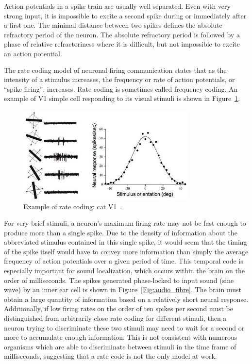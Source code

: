 Action potentials in a spike train are usually well separated. Even with very strong input, it is impossible to excite a second spike during or immediately after a first one. The minimal distance between two spikes defines the absolute refractory period of the neuron. The absolute refractory period is followed by a phase of relative refractoriness where it is difficult, but not impossible to excite an action potential.

The rate coding model of neuronal firing communication states that as the intensity of a stimulus increases, the frequency or rate of action potentials, or ``spike firing'', increases. Rate coding is sometimes called frequency coding.
An example of V1 simple cell responding to its visual stimuli is shown in Figure~\ref{Fig:v1}.

\begin{figure}[bt]
	\centering
	\includegraphics[width=0.8\textwidth]{pics_snn/v1.jpg}
	\caption{Example of rate coding: cat V1~\cite{hubel1962receptive}.}
	\label{Fig:v1}
\end{figure}

For very brief stimuli, a neuron's maximum firing rate may not be fast enough to produce more than a single spike. Due to the density of information about the abbreviated stimulus contained in this single spike, it would seem that the timing of the spike itself would have to convey more information than simply the average frequency of action potentials over a given period of time. This temporal code is especially important for sound localization, which occurs within the brain on the order of milliseconds. The spikes generated phase-locked to input sound (sine wave) by an inner ear cell is shown in Figure~\ref{Fig:audio_fibre}. The brain must obtain a large quantity of information based on a relatively short neural response. Additionally, if low firing rates on the order of ten spikes per second must be distinguished from arbitrarily close rate coding for different stimuli, then a neuron trying to discriminate these two stimuli may need to wait for a second or more to accumulate enough information. This is not consistent with numerous organisms which are able to discriminate between stimuli in the time frame of milliseconds, suggesting that a rate code is not the only model at work.


